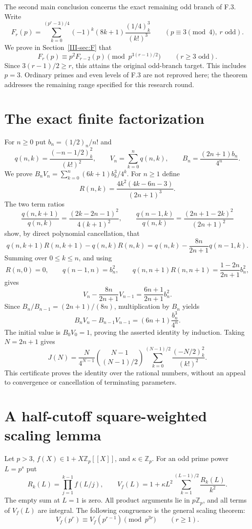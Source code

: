 \documentclass[11pt,letterpaper]{article}
\numberwithin{equation}{section}
\begin{document}
The second main conclusion concerns the exact remaining odd branch
of F.3. Write
\[
 F_r(p)=\sum_{k=0}^{(p^r-3)/4}(-1)^k(8k+1)
                         \frac{(1/4)_k^3}{(k!)^3}
 \qquad(p\equiv3\pmod4,\ r\text{ odd}).
\]
We prove in Section~\ref{III-sec:F} that
\[
 \boxed{F_r(p)\equiv p^2F_{r-2}(p)\pmod{p^{3(r-1)/2}}
        \qquad(r\ge3\text{ odd}).}
\]
Since $3(r-1)/2\ge r$, this attains the original odd-branch target.
This includes $p=3$. Ordinary primes and even levels of F.3 are not
reproved here; the theorem addresses the remaining range specified
for this research round.

\section{The exact finite factorization}\label{loc-III-2}
For $n\ge0$ put $b_n=(1/2)_n/n!$ and
\[
 q(n,k)=\frac{(-n-1/2)_k^2}{(k!)^2},\qquad
 V_n=\sum_{k=0}^{n}q(n,k),\qquad
 B_n=\frac{(2n+1)b_n}{4^n}.
\]
We prove $B_nV_n=\sum_{k=0}^{n}(6k+1)b_k^3/4^k$.
For $n\ge1$ define
\[
 R(n,k)=\frac{4k^2(4k-6n-3)}{(2n+1)^3}.
\]
The two term ratios
\[
 \frac{q(n,k+1)}{q(n,k)}=
 \frac{(2k-2n-1)^2}{4(k+1)^2},\qquad
 \frac{q(n-1,k)}{q(n,k)}=
 \frac{(2n+1-2k)^2}{(2n+1)^2}
\]
show, by direct polynomial cancellation, that
\[
 q(n,k+1)R(n,k+1)-q(n,k)R(n,k)
 =q(n,k)-\frac{8n}{2n+1}q(n-1,k).
\]
Summing over $0\le k\le n$, and using
\[
 R(n,0)=0,\qquad q(n-1,n)=b_n^2,\qquad
 q(n,n+1)R(n,n+1)=\frac{1-2n}{2n+1}b_n^2,
\]
gives
\[
 V_n-\frac{8n}{2n+1}V_{n-1}
 =\frac{6n+1}{2n+1}b_n^2.
\]
Since $B_n/B_{n-1}=(2n+1)/(8n)$, multiplication by $B_n$
yields
\[
 B_nV_n-B_{n-1}V_{n-1}=(6n+1)\frac{b_n^3}{4^n}.
\]
The initial value is $B_0V_0=1$, proving the asserted identity by
induction. Taking $N=2n+1$ gives
\[
 J(N)=\frac{N}{4^{N-1}}\binom{N-1}{(N-1)/2}
       \sum_{k=0}^{(N-1)/2}\frac{(-N/2)_k^2}{(k!)^2}.
\]
This certificate proves the identity over the rational numbers, without
an appeal to convergence or cancellation of terminating parameters.
\section{A half-cutoff square-weighted scaling lemma}\label{loc-III-3}
Let $p>3$, $f(X)\in1+X\mathbb Z_p[[X]]$, and $\kappa\in\mathbb Z_p$.
For an odd prime power $L=p^s$ put
\[
 R_k(L)=\prod_{j=1}^{k-1}f(L/j),\qquad
 V_f(L)=1+\kappa L^2\sum_{k=1}^{(L-1)/2}\frac{R_k(L)}{k^2}.
\]
The empty sum at $L=1$ is zero. All product arguments lie in
$p\mathbb Z_p$, and all terms of $V_f(L)$ are integral. The following congruence is the general scaling theorem:
\begin{equation}\label{III-Jnew:halfscale}
 V_f(p^r)\equiv V_f(p^{r-1})\pmod{p^{3r}}\qquad(r\ge1).
\end{equation}
\end{document}
